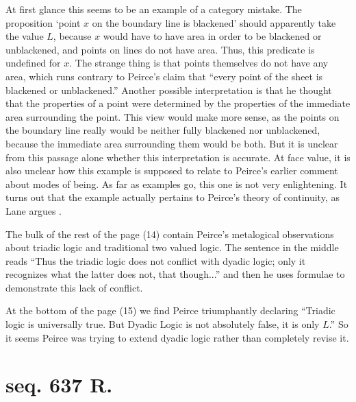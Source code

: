 At first glance this seems to be an example of a category mistake. The proposition `point $x$ on the boundary line is blackened' should apparently take the value $L$, because $x$ would have to have area in order to be blackened or unblackened, and points on lines do not have area. Thus, this predicate is undefined for $x$. The strange thing is that points themselves do not have any area, which runs contrary to Peirce's claim that ``every point of the sheet is blackened or unblackened.'' Another possible interpretation is that he thought that the properties of a point were determined by the properties of the immediate area surrounding the point. This view would make more sense, as the points on the boundary line really would be neither fully blackened nor unblackened, because the immediate area surrounding them would be both. But it is unclear from this passage alone whether this interpretation is accurate. At face value, it is also unclear how this example is supposed to relate to Peirce's earlier comment about modes of being. As far as examples go, this one is not very enlightening. It turns out that the example actually pertains to Peirce's theory of continuity, as Lane argues \citeyearpar{lane_peirces_1999}. 

The bulk of the rest of the page (14) contain Peirce's metalogical observations about triadic logic and traditional two valued logic. The sentence in the middle reads ``Thus the triadic logic does not conflict with dyadic logic; only it recognizes what the latter does not, that though...'' and then he uses formulae to demonstrate this lack of conflict.

At the bottom of the page (15) we find Peirce triumphantly declaring ``Triadic logic is universally true. But Dyadic Logic is not absolutely false, it is only $L$.'' So it seems Peirce was trying to extend dyadic logic rather than completely revise it.

\section{seq. 637 R.}

